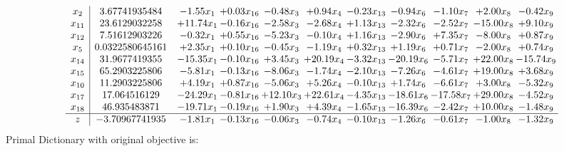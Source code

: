 \documentclass[9pt]{article}
\begin{document}
\[\begin{array}{c| c c@{\hskip 2pt} c@{\hskip 2pt} c@{\hskip 2pt} c@{\hskip 2pt} c@{\hskip 2pt} c@{\hskip 2pt} c@{\hskip 2pt} c@{\hskip 2pt} c@{\hskip 2pt} }
 x_{2}   &  3.67741935484 & -1.55 x_{1} & +  0.03 x_{16} & -0.48 x_{3} & +  0.94 x_{4} & -0.23 x_{13} & -0.94 x_{6} & -1.10 x_{7} & +  2.00 x_{8} & -0.42 x_{9}\\
 x_{11}   &  23.6129032258 & + 11.74 x_{1} & -0.16 x_{16} & -2.58 x_{3} & -2.68 x_{4} & +  1.13 x_{13} & -2.32 x_{6} & -2.52 x_{7} & -15.00 x_{8} & +  9.10 x_{9}\\
 x_{12}   &  7.51612903226 & -0.32 x_{1} & +  0.55 x_{16} & -5.23 x_{3} & -0.10 x_{4} & +  1.16 x_{13} & -2.90 x_{6} & +  7.35 x_{7} & -8.00 x_{8} & +  0.87 x_{9}\\
 x_{5}   &  0.0322580645161 & +  2.35 x_{1} & +  0.10 x_{16} & -0.45 x_{3} & -1.19 x_{4} & +  0.32 x_{13} & +  1.19 x_{6} & +  0.71 x_{7} & -2.00 x_{8} & +  0.74 x_{9}\\
 x_{14}   &  31.9677419355 & -15.35 x_{1} & -0.10 x_{16} & +  3.45 x_{3} & + 20.19 x_{4} & -3.32 x_{13} & -20.19 x_{6} & -5.71 x_{7} & + 22.00 x_{8} & -15.74 x_{9}\\
 x_{15}   &  65.2903225806 & -5.81 x_{1} & -0.13 x_{16} & -8.06 x_{3} & -1.74 x_{4} & -2.10 x_{13} & -7.26 x_{6} & -4.61 x_{7} & + 19.00 x_{8} & +  3.68 x_{9}\\
 x_{10}   &  11.2903225806 & +  4.19 x_{1} & +  0.87 x_{16} & -5.06 x_{3} & +  5.26 x_{4} & -0.10 x_{13} & +  1.74 x_{6} & -6.61 x_{7} & +  3.00 x_{8} & -5.32 x_{9}\\
 x_{17}   &  17.064516129 & -24.29 x_{1} & -0.81 x_{16} & + 12.10 x_{3} & + 22.61 x_{4} & -4.35 x_{13} & -18.61 x_{6} & -17.58 x_{7} & + 29.00 x_{8} & -4.52 x_{9}\\
 x_{18}   &  46.935483871 & -19.71 x_{1} & -0.19 x_{16} & +  1.90 x_{3} & +  4.39 x_{4} & -1.65 x_{13} & -16.39 x_{6} & -2.42 x_{7} & + 10.00 x_{8} & -1.48 x_{9}\\
\hline
z    &  -3.70967741935 & -1.81 x_{1} & -0.13 x_{16} & -0.06 x_{3} & -0.74 x_{4} & -0.10 x_{13} & -1.26 x_{6} & -0.61 x_{7} & -1.00 x_{8} & -1.32 x_{9}\\
\end{array}\]
Primal Dictionary with original objective is:
\end{document}
